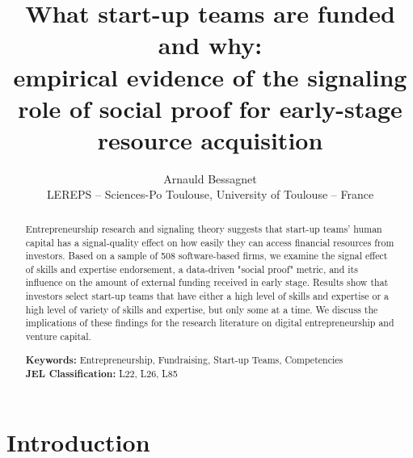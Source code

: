 \documentclass[12pt]{article}
\begin{document}
\title{What start-up teams are funded and why: \\ empirical evidence of the signaling role of social proof for early-stage resource acquisition}
\date{\vspace{-3ex}}
\author{Arnauld Bessagnet \\ \footnotesize{LEREPS – Sciences-Po Toulouse, University of Toulouse – France} \\}

\maketitle \vspace{-1,5em}

\begin{abstract}
\noindent
Entrepreneurship research and signaling theory suggests that start-up teams' human capital has a signal-quality effect on how easily they can access financial resources from investors. Based on a sample of 508 software-based firms, we examine the signal effect of skills and expertise endorsement, a data-driven "social proof" metric, and its influence on the amount of external funding received in early stage. Results show that investors select start-up teams that have either a high level of skills and expertise or a high level of variety of skills and expertise, but only some at a time. We discuss the implications of these findings for the research literature on digital entrepreneurship and venture capital. \newline

\begin{obeylines}
\noindent \footnotesize{}{\textbf{Keywords:} Entrepreneurship, Fundraising, Start-up Teams, Competencies}
\noindent \footnotesize{\textbf{JEL Classification:} L22, L26, L85}
\end{obeylines}

\end{abstract}

\clearpage
\section{Introduction}
\end{document}
